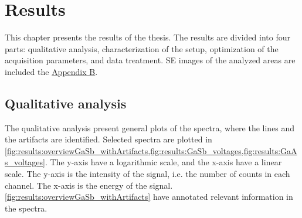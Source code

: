 \chapter{Results}
\label{ch:results}




This chapter presents the results of the thesis.
The results are divided into four parts: qualitative analysis, characterization of the setup, optimization of the acquisition parameters, and data treatment.
SE images of the analyzed areas are included the \hyperref[appendix:SE_images]{Appendix B}.





\section{Qualitative analysis}
\label{results:qualitative_analysis}

The qualitative analysis present general plots of the spectra, where the lines and the artifacts are identified.
Selected spectra are plotted in \cref{fig:results:overviewGaSb_withArtifacts,fig:results:GaSb_voltages,fig:results:GaAs_voltages}.
The y-axis have a logarithmic scale, and the x-axis have a linear scale.
The y-axis is the intensity of the signal, i.e. the number of counts in each channel.
The x-axis is the energy of the signal.
\cref{fig:results:overviewGaSb_withArtifacts} have annotated relevant information in the spectra.



